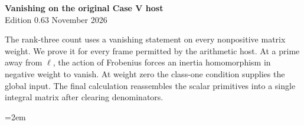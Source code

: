 \begin{center}
{\Large\bfseries Vanishing on the original Case V host}\\[4pt]
Edition 0.63  November 2026
\end{center}

The rank-three count uses a vanishing statement on every nonpositive
matrix weight. We prove it for every frame permitted by the arithmetic
host. At a prime away from $\ell$, the action of Frobenius forces an
inertia homomorphism in negative weight to vanish. At weight zero the
class-one condition supplies the global input. The final calculation
reassembles the scalar primitives into a single integral matrix
after clearing denominators.

\begingroup\emergencystretch=2em


\endgroup
